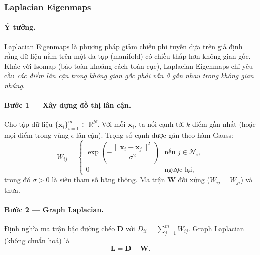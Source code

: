 \subsubsection{Laplacian Eigenmaps}
 
\paragraph{Ý tưởng.}
Laplacian Eigenmaps là phương pháp giảm chiều phi tuyến dựa trên giả định
rằng dữ liệu nằm trên một đa tạp (manifold) có chiều thấp hơn không gian
gốc. Khác với Isomap (bảo toàn khoảng cách toàn cục), Laplacian Eigenmaps
chỉ yêu cầu \emph{các điểm lân cận trong không gian gốc phải vẫn ở gần nhau
trong không gian nhúng}.
 
\paragraph{Bước 1 — Xây dựng đồ thị lân cận.}
Cho tập dữ liệu $\{\mathbf{x}_i\}_{i=1}^m \subset \mathbb{R}^N$.
Với mỗi $\mathbf{x}_i$, ta nối cạnh tới $k$ điểm gần nhất
(hoặc mọi điểm trong vùng $\epsilon$-lân cận).
Trọng số cạnh được gán theo hàm Gauss:
\begin{equation}
  W_{ij} =
  \begin{cases}
    \exp\!\left(-\dfrac{\|\mathbf{x}_i - \mathbf{x}_j\|^2}{\sigma^2}\right)
      & \text{nếu } j \in \mathcal{N}_i, \\[4pt]
    0 & \text{ngược lại,}
  \end{cases}
\end{equation}
trong đó $\sigma > 0$ là siêu tham số băng thông.
Ma trận $\mathbf{W}$ đối xứng ($W_{ij}=W_{ji}$) và thưa.
 
\paragraph{Bước 2 — Graph Laplacian.}
Định nghĩa ma trận bậc đường chéo $\mathbf{D}$ với
$D_{ii} = \sum_{j=1}^m W_{ij}$.
Graph Laplacian (không chuẩn hoá) là
\begin{equation}
  \mathbf{L} = \mathbf{D} - \mathbf{W}.
\end{equation}
 
